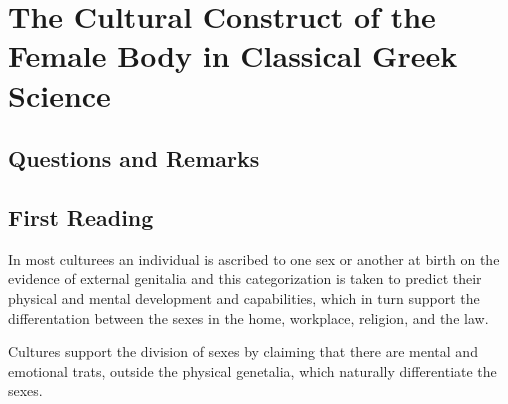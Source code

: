 %
%
%
\chapter{The Cultural Construct of the Female Body in Classical Greek Science}
\label{CultConstrFemBod} %








\abstract{}

\section{Questions and Remarks}
\label{sec:QR5}




\section{First Reading}
\label{sec:FirRead5}

In most culturees an individual is ascribed to one sex or another at birth on the evidence of external genitalia and this categorization is taken to predict their physical and mental development and capabilities, which in turn support the differentation between the sexes in the home, workplace, religion, and the law. 

\begin{rmk}
    Cultures support the division of sexes by claiming that there are mental and emotional trats, outside the physical genetalia, which naturally differentiate the sexes.
\end{rmk}

